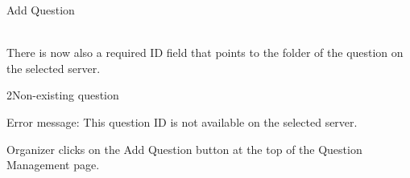 
\begin{uc}{Add Question}

     \\
    There is now also a required ID field that points to the folder of the question on the
    selected server.
    
    \begin{uc-ext}

        \begin{uc-fail}{2}{Non-existing question}
        \item Error message: This question ID is not available on the selected server.
        \end{uc-fail}

    \end{uc-ext}
    
    \begin{uc-trig}
        Organizer clicks on the Add Question button at the top of the Question Management
        page.
    \end{uc-trig}
\end{uc}

